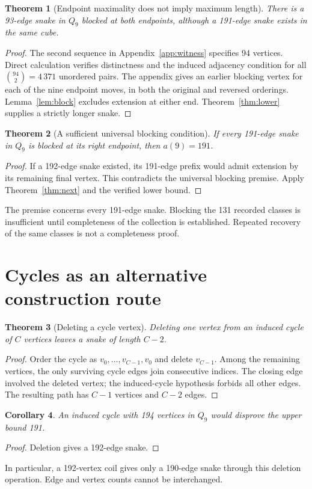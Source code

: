 \documentclass[11pt,a4paper]{article}
\newtheorem{theorem}{Theorem}[section]
\newtheorem{corollary}[theorem]{Corollary}
\theoremstyle{definition}
\theoremstyle{remark}
\newcommand{\Q}{Q}
\begin{document}
\begin{theorem}[Endpoint maximality does not imply maximum length]
There is a 93-edge snake in $\Q_9$ blocked at both endpoints, although a 191-edge snake exists in the same cube.
\end{theorem}
\begin{proof}
The second sequence in Appendix~\ref{app:witness} specifies 94 vertices. Direct calculation verifies distinctness and the induced adjacency condition for all $\binom{94}{2}=4\,371$ unordered pairs. The appendix gives an earlier blocking vertex for each of the nine endpoint moves, in both the original and reversed orderings. Lemma~\ref{lem:block} excludes extension at either end. Theorem~\ref{thm:lower} supplies a strictly longer snake.
\end{proof}

\begin{theorem}[A sufficient universal blocking condition]
If every 191-edge snake in $\Q_9$ is blocked at its right endpoint, then $a(9)=191$.
\end{theorem}
\begin{proof}
If a 192-edge snake existed, its 191-edge prefix would admit extension by its remaining final vertex. This contradicts the universal blocking premise. Apply Theorem~\ref{thm:next} and the verified lower bound.
\end{proof}
The premise concerns every 191-edge snake. Blocking the 131 recorded classes is insufficient until completeness of the collection is established. Repeated recovery of the same classes is not a completeness proof.

\section{Cycles as an alternative construction route}
\begin{theorem}[Deleting a cycle vertex]
Deleting one vertex from an induced cycle of $C$ vertices leaves a snake of length $C-2$.
\end{theorem}
\begin{proof}
Order the cycle as $v_0,\ldots,v_{C-1},v_0$ and delete $v_{C-1}$. Among the remaining vertices, the only surviving cycle edges join consecutive indices. The closing edge involved the deleted vertex; the induced-cycle hypothesis forbids all other edges. The resulting path has $C-1$ vertices and $C-2$ edges.
\end{proof}
\begin{corollary}
An induced cycle with 194 vertices in $\Q_9$ would disprove the upper bound 191.
\end{corollary}
\begin{proof}
Deletion gives a 192-edge snake.
\end{proof}
In particular, a 192-vertex coil gives only a 190-edge snake through this deletion operation. Edge and vertex counts cannot be interchanged.
\end{document}
